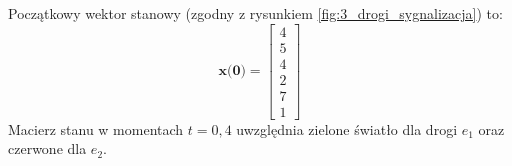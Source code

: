 \documentclass[12pt]{book}
\theoremstyle{plain}
\begin{document}
\def \xzero{
	\begin{bmatrix}
		4 \\ 5 \\ 4 \\ 2 \\ 7 \\ 1
	\end{bmatrix}
}
Początkowy wektor stanowy (zgodny z rysunkiem \ref{fig:3_drogi_sygnalizacja}) to:
\[\textbf{x(0)}= \xzero \]
Macierz stanu w momentach $t=0,4$ uwzględnia zielone światło dla drogi $e_1$ oraz czerwone dla $e_2$.
\def \aeI{
\begin{bmatrix}
	0 & 0                     & 0 & 0 & 0 & 0 \\
	1 & \colorbox{red!30}{0}  & 0 & 0 & 0 & 0 \\
	0 & 0                     & 0 & 0 & 0 & 0 \\
	0 & 0                     & 1 & \colorbox{red!30}{1} & 0 & 0 & \\
	0 & \colorbox{green!30}{1}  & 0 & \colorbox{green!30}{0} & 0 & 0 \\
	0 & 0                     & 0 & 0 & 1 & 0 \\
\end{bmatrix}

}
\end{document}
